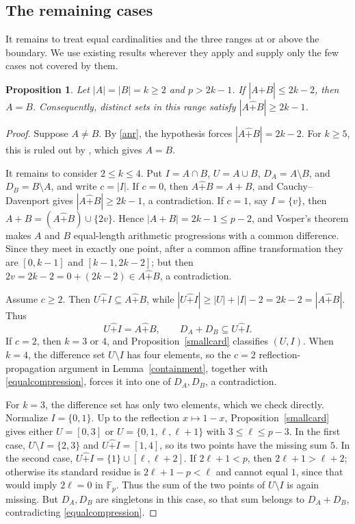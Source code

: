 \documentclass[10pt,a4paper]{amsart}
\newtheorem{proposition}{Proposition}[section]
\newcommand{\F}{\mathbb{F}_p}
\newcommand{\rs}{\mathbin{\widehat+}}
\begin{document}
\subsection{The remaining cases}\label{remainingcases}

It remains to treat equal cardinalities and the three ranges at or above
the boundary.  We use existing results wherever they apply and supply
only the few cases not covered by them.

\begin{proposition}\label{equalprop}
Let $|A|=|B|=k\ge2$ and $p>2k-1$.  If $|A\rs B|\le2k-2$, then $A=B$.
Consequently, distinct sets in this range satisfy $|A\rs B|\ge2k-1$.
\end{proposition}
\begin{proof}
Suppose $A\ne B$.  By \eqref{anr}, the hypothesis forces
$|A\rs B|=2k-2$.  For $k\ge5$, this is ruled out by
\cite[Theorem 7]{DGHM}, which gives $A=B$.

It remains to consider $2\le k\le4$.  Put $I=A\cap B$,
$U=A\cup B$, $D_A=A\setminus B$, and $D_B=B\setminus A$, and write
$c=|I|$.  If $c=0$, then $A\rs B=A+B$, and
Cauchy--Davenport gives $|A\rs B|\ge2k-1$, a contradiction.
If $c=1$, say $I=\{v\}$, then
$A+B=(A\rs B)\cup\{2v\}$.  Hence $|A+B|=2k-1\le p-2$, and Vosper's
theorem makes $A$ and $B$ equal-length arithmetic progressions with a
common difference.  Since they meet in exactly one point, after a common
affine transformation they are $[0,k-1]$ and $[k-1,2k-2]$; but then
$2v=2k-2=0+(2k-2)\in A\rs B$, a contradiction.

Assume $c\ge2$.  Then $U\rs I\subseteq A\rs B$, while
$|U\rs I|\ge |U|+|I|-2=2k-2=|A\rs B|$.  Thus
\begin{equation}\label{equalcompression}
 U\rs I=A\rs B,
 \qquad D_A+D_B\subseteq U\rs I.
\end{equation}
If $c=2$, then $k=3$ or $4$, and Proposition~\ref{smallcard}
classifies $(U,I)$.  When $k=4$, the difference set $U\setminus I$
has four elements, so the $c=2$ reflection-propagation argument in
Lemma~\ref{containment}, together with \eqref{equalcompression},
forces it into one of $D_A,D_B$, a contradiction.

For $k=3$, the difference set has only two elements, which we check
directly.  Normalize $I=\{0,1\}$.  Up to the reflection $x\mapsto1-x$,
Proposition~\ref{smallcard} gives either $U=[0,3]$ or
$U=\{0,1,\ell,\ell+1\}$ with $3\le\ell\le p-3$.
In the first case, $U\setminus I=\{2,3\}$ and
$U\rs I=[1,4]$, so its two points have the missing sum $5$.
In the second case, $U\rs I=\{1\}\cup[\ell,\ell+2]$.
If $2\ell+1<p$, then $2\ell+1>\ell+2$; otherwise its standard
residue is $2\ell+1-p<\ell$ and cannot equal $1$, since that would
imply $2\ell=0$ in $\F$.  Thus the sum of the two points of
$U\setminus I$ is again missing.  But $D_A,D_B$ are singletons in
this case, so that sum belongs to $D_A+D_B$, contradicting
\eqref{equalcompression}.


\end{proof}
\end{document}
